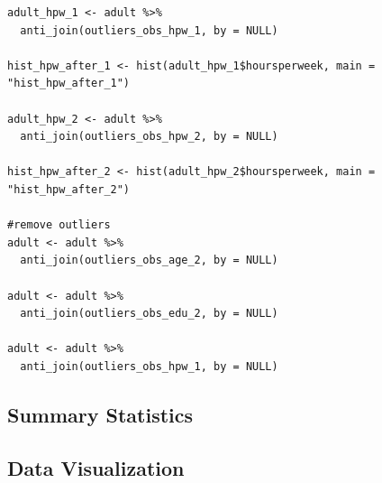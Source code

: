\documentclass{article}
\begin{document}
\begin{verbatim}
adult_hpw_1 <- adult %>%
  anti_join(outliers_obs_hpw_1, by = NULL)

hist_hpw_after_1 <- hist(adult_hpw_1$hoursperweek, main = "hist_hpw_after_1")

adult_hpw_2 <- adult %>%
  anti_join(outliers_obs_hpw_2, by = NULL)

hist_hpw_after_2 <- hist(adult_hpw_2$hoursperweek, main = "hist_hpw_after_2")

#remove outliers
adult <- adult %>%
  anti_join(outliers_obs_age_2, by = NULL)

adult <- adult %>%
  anti_join(outliers_obs_edu_2, by = NULL)

adult <- adult %>%
  anti_join(outliers_obs_hpw_1, by = NULL)

\end{verbatim}

\subsection{Summary Statistics}

\subsection{Data Visualization}
\end{document}
